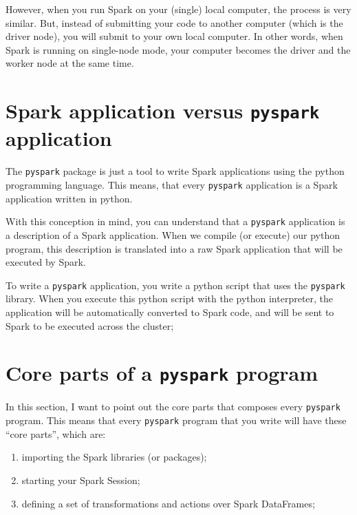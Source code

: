 \documentclass[
  11pt,
  letterpaper,
  DIV=11,
  numbers=noendperiod]{scrreprt}
\begin{document}
However, when you run Spark on your (single) local computer, the process
is very similar. But, instead of submitting your code to another
computer (which is the driver node), you will submit to your own local
computer. In other words, when Spark is running on single-node mode,
your computer becomes the driver and the worker node at the same time.

\hypertarget{spark-application-versus-pyspark-application}{%
\section{\texorpdfstring{Spark application versus \texttt{pyspark}
application}{Spark application versus pyspark application}}\label{spark-application-versus-pyspark-application}}

The \texttt{pyspark} package is just a tool to write Spark applications
using the python programming language. This means, that every
\texttt{pyspark} application is a Spark application written in python.

With this conception in mind, you can understand that a \texttt{pyspark}
application is a description of a Spark application. When we compile (or
execute) our python program, this description is translated into a raw
Spark application that will be executed by Spark.

To write a \texttt{pyspark} application, you write a python script that
uses the \texttt{pyspark} library. When you execute this python script
with the python interpreter, the application will be automatically
converted to Spark code, and will be sent to Spark to be executed across
the cluster;

\hypertarget{core-parts-of-a-pyspark-program}{%
\section{\texorpdfstring{Core parts of a \texttt{pyspark}
program}{Core parts of a pyspark program}}\label{core-parts-of-a-pyspark-program}}

In this section, I want to point out the core parts that composes every
\texttt{pyspark} program. This means that every \texttt{pyspark} program
that you write will have these ``core parts'', which are:

\begin{enumerate}
\def\labelenumi{\arabic{enumi})}
\item
  importing the Spark libraries (or packages);
\item
  starting your Spark Session;
\item
  defining a set of transformations and actions over Spark DataFrames;
\end{enumerate}
\end{document}
